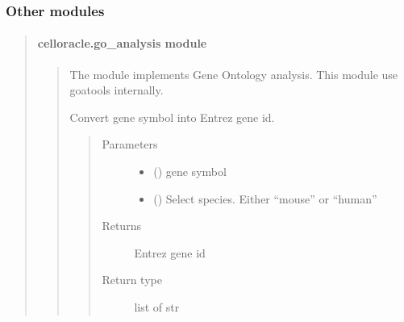 \documentclass[letterpaper,10pt,english]{sphinxmanual}
\begin{document}
\subsubsection{Other modules}
\label{\detokenize{modules/celloracle:other-modules}}\begin{quote}


\paragraph{celloracle.go\_analysis module}
\label{\detokenize{modules/celloracle.go_analysis:celloracle-go-analysis-module}}\label{\detokenize{modules/celloracle.go_analysis::doc}}\begin{quote}
\label{\detokenize{modules/celloracle.go_analysis:module-celloracle.go_analysis}}
The {\hyperref[\detokenize{modules/celloracle.go_analysis:module-celloracle.go_analysis}]{}} module implements Gene Ontology analysis.
This module use goatools internally.

\begin{fulllineitems}
\label{\detokenize{modules/celloracle.go_analysis:celloracle.go_analysis.geneSymbol2ID}}
Convert gene symbol into Entrez gene id.
\begin{quote}\begin{description}
\item[{Parameters}] \leavevmode\begin{itemize}
\item {} 
 () \textendash{} gene symbol

\item {} 
 () \textendash{} Select species. Either “mouse” or “human”

\end{itemize}

\item[{Returns}] \leavevmode
Entrez gene id

\item[{Return type}] \leavevmode
list of str


\end{description}
\end{quote}
\end{fulllineitems}
\end{quote}
\end{quote}
\end{document}
